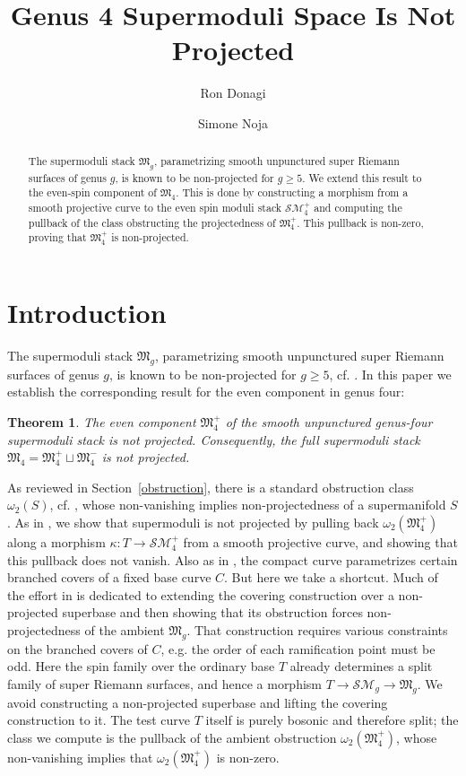 \documentclass[11pt,a4paper,dvipsnames]{amsart}
\title{Genus 4 Supermoduli Space Is Not Projected}
\author{Ron Donagi}
\author{Simone Noja}
\date{}
\numberwithin{equation}{section}
\theoremstyle{plain}
\newtheorem{theorem}{Theorem}[section]
\theoremstyle{definition}
\newcommand{\M}{\mathfrak M}
\newcommand{\SM}{\mathcal S\mathcal M}
\begin{document}
\begin{abstract}
The supermoduli stack $\M_g$, parametrizing smooth unpunctured super Riemann surfaces of
genus $g$, is known to be non-projected for $g \ge 5$. We extend this result to the even-spin component of $\M_4$. This is done by constructing a morphism from a smooth projective curve to the even spin moduli stack $\SM_4^{+}$ and computing the pullback of the class obstructing the projectedness of $\M_4^{+}$. This pullback is non-zero, proving that $\M_4^{+}$ is non-projected.
\end{abstract}

\maketitle
\tableofcontents
\section{Introduction}

The supermoduli stack
$\M_g$, parametrizing smooth unpunctured super Riemann surfaces of genus $g$, is known to be non-projected for $g\geq 5$, cf. 
\cite[Theorem~1.1]{DonagiWittenNonprojected}.
In this paper we establish the corresponding result for the even component in genus four:

\begin{theorem}\label{thm:main}
The even component $\M_4^+$ of the smooth unpunctured genus-four
supermoduli stack is not projected.  Consequently, the full supermoduli
stack $\M_4=\M_4^+\sqcup\M_4^-$ is not projected.
\end{theorem}

As reviewed in Section~\ref{obstruction}, there is a standard obstruction class $\omega_2(S)$, cf.
\cite{Green}, whose non-vanishing implies non-projectedness of a supermanifold $S$.
As in \cite{DonagiWittenNonprojected}, we show that supermoduli is not projected by pulling back
$\omega_2(\M_4^+)$ along a morphism $\kappa:T\to\SM_4^+$ from a smooth projective curve,
and showing that this pullback does not vanish. 
Also as in \cite{DonagiWittenNonprojected}, the compact curve parametrizes certain branched covers of a fixed base curve $C$.
But here we take a shortcut. Much of the effort in \cite{DonagiWittenNonprojected} is dedicated to extending the covering construction over a non-projected superbase and then showing that its obstruction forces non-projectedness of the ambient $\M_g$.
That construction requires various constraints on the branched covers of $C$, e.g. the order of each ramification point must be odd. Here the spin family over the ordinary base $T$ already determines a split family of super Riemann surfaces, and hence a morphism $T\to\SM_g\to\M_g$. We avoid constructing a non-projected superbase and lifting the covering construction to it. The test curve $T$ itself is purely bosonic and therefore split; the class we compute is the pullback of the ambient obstruction $\omega_2(\M_4^+)$, whose non-vanishing implies that $\omega_2(\M_4^+)$ is non-zero.
\end{document}
